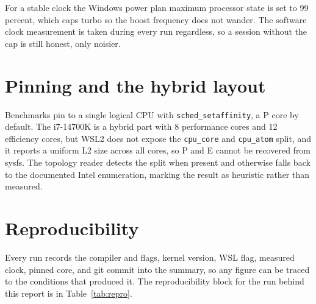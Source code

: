 For a stable clock the Windows power plan maximum processor state is set to 99
percent, which caps turbo so the boost frequency does not wander. The software
clock measurement is taken during every run regardless, so a session without the
cap is still honest, only noisier.

\section{Pinning and the hybrid layout}

Benchmarks pin to a single logical CPU with \texttt{sched\_setaffinity}, a P
core by default. The i7-14700K is a hybrid part with 8 performance cores and 12
efficiency cores, but WSL2 does not expose the \texttt{cpu\_core} and
\texttt{cpu\_atom} split, and it reports a uniform L2 size across all cores, so P
and E cannot be recovered from sysfs. The topology reader detects the split when
present and otherwise falls back to the documented Intel enumeration, marking the
result as heuristic rather than measured.

\section{Reproducibility}

Every run records the compiler and flags, kernel version, WSL flag, measured
clock, pinned core, and git commit into the summary, so any figure can be traced
to the conditions that produced it. The reproducibility block for the run behind
this report is in Table~\ref{tab:repro}.

\begin{table}[h]
\centering
\caption{Reproducibility record for the committed run.}
\label{tab:repro}

\end{table}
